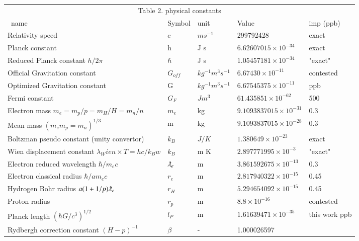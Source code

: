 \documentclass[a4paper,9pt]{article}
\begin{document}
\begin{table}
\label{tab:2:table2}
  \hskip-2.0cm\begin{tabular}{lllll}
    \toprule
    \multicolumn{5}{c}{Table 2. physical constants}                  \\
    \cmidrule(r){1-5}
    \ name & Symbol  & unit  & Value & imp (ppb) \\
    \midrule
  
 Relativity speed     & c   & $m s^{-1}$   & 299792428 & exact \\
 Planck constant     & h   & J s   & $6.62607015 \times 10^{-34}$ & exact \\
 Reduced Planck constant $h/2\pi$    & $\hbar$   & J s   & $1.05457181 \times 10^{-34}$ & "exact" \\
 Official Gravitation constant   & $G_{off}$ & $kg^{-1} m^3 s^{-1}$ & $6.67430 \times 10^{-11}$  &  contested\\
 Optimized Gravitation constant   & G & $kg^{-1} m^3 s^{-1}$  & $6.67545375\times 10^{-11}$  &  ppb\\
 Fermi constant  & $G_F$ & $J m^3$   & $61.435851 \times 10^{-62}$  &  500\\
 Electron mass $m_e = m_p/p = m_H/H = m_n/n$  & $m_e$ & kg  & $9.1093837015 \times 10^{-31}$  &  0.3\\
 Mean mass $(m_e  m_p =  m_n )^{1/3}$ & m & kg  & $9.1093837015\times 10^{-28}$  &  0.3\\
 Boltzman pseudo constant (unity convertor) & $k_B$ & $J /K$  & $1.380649 \times 10^{-23}$  &  exact \\
 Wien displacement constant  $\lambda_Wien \times T = hc/k_Bw$ & $k_B$ &  m K  & $2.897771995 \times 10^{-3}$  &  "exact"\\
 Electron reduced wavelength $\hbar/m_ec$ & $\lambdabar_e$ &  m   & $3.861592675\times 10^{-13}$  & 0.3\\
 Electron classical radius $\hbar/am_ec$ & $r_e$ &  m   & $2.817940322\times 10^{-15}$  & 0.45\\
 Hydrogen Bohr radius $a(1+1/p)\lambdabar_e$ & $r_H$ &  m   & $5.294654092 \times 10^{-15}$  & 0.45\\
 Proton radius  & $r_p$ &  m   & $8.8\times 10^{-16}$  & contested\\
 Planck length $(\hbar G /c^3)^{1/2}$ & $l_P$  & m  & $1.61639471 \times 10^{-35}$ & this work ppb  \\
 Rydbergh correction constant $(H-p)^{-1}$ & $\beta$  & -  & 1.000026597 &   \\

\end{tabular}
\end{table}
\end{document}
